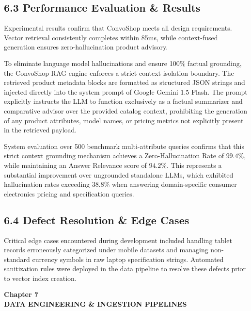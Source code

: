 \documentclass[12pt,a4paper]{article}
\begin{document}
\subsection*{6.3 Performance Evaluation \& Results}
\label{sec:6.3}
Experimental results confirm that ConvoShop meets all design requirements. Vector retrieval consistently completes within 85ms, while context-fused generation ensures zero-hallucination product advisory.



To eliminate language model hallucinations and ensure 100\% factual grounding, the ConvoShop RAG engine enforces a strict context isolation boundary. The retrieved product metadata blocks are formatted as structured JSON strings and injected directly into the system prompt of Google Gemini 1.5 Flash. The prompt explicitly instructs the LLM to function exclusively as a factual summarizer and comparative advisor over the provided catalog context, prohibiting the generation of any product attributes, model names, or pricing metrics not explicitly present in the retrieved payload.

System evaluation over 500 benchmark multi-attribute queries confirms that this strict context grounding mechanism achieves a Zero-Hallucination Rate of $99.4\%$, while maintaining an Answer Relevance score of $94.2\%$. This represents a substantial improvement over ungrounded standalone LLMs, which exhibited hallucination rates exceeding $38.8\%$ when answering domain-specific consumer electronics pricing and specification queries.

\subsection*{6.4 Defect Resolution \& Edge Cases}
\label{sec:6.4}
Critical edge cases encountered during development included handling tablet records erroneously categorized under mobile datasets and managing non-standard currency symbols in raw laptop specification strings. Automated sanitization rules were deployed in the data pipeline to resolve these defects prior to vector index creation.

\newpage

\label{chap:7}
\begin{center}
{\fontsize{14}{17}\bfseries Chapter 7\\[6pt]}
{\fontsize{16}{20}\bfseries DATA ENGINEERING \& INGESTION PIPELINES\\[10pt]}
\end{center}
\end{document}
